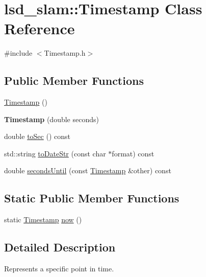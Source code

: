 \hypertarget{classlsd__slam_1_1_timestamp}{\section{lsd\-\_\-slam\-:\-:Timestamp Class Reference}
\label{classlsd__slam_1_1_timestamp}
}


{\ttfamily \#include $<$Timestamp.\-h$>$}

\subsection*{Public Member Functions}
\begin{DoxyCompactItemize}
\item 
\hyperlink{classlsd__slam_1_1_timestamp_a8e3fcd5158f45d25f8eb89d7aa615f66}{Timestamp} ()
\item 
\hypertarget{classlsd__slam_1_1_timestamp_a6f4a6030dcdeda85ad3718569b00d4cb}{{\bfseries Timestamp} (double seconds)}\label{classlsd__slam_1_1_timestamp_a6f4a6030dcdeda85ad3718569b00d4cb}

\item 
double \hyperlink{classlsd__slam_1_1_timestamp_a7f3a5a2a40b213c59e3a4195e801ffe6}{to\-Sec} () const 
\item 
std\-::string \hyperlink{classlsd__slam_1_1_timestamp_aca4015dc0ef5190447b152ac1fc8f848}{to\-Date\-Str} (const char $\ast$format) const 
\item 
double \hyperlink{classlsd__slam_1_1_timestamp_a4caed49b69cb2a1a6f0634dc5a76c7e8}{seconds\-Until} (const \hyperlink{classlsd__slam_1_1_timestamp}{Timestamp} \&other) const 
\end{DoxyCompactItemize}
\subsection*{Static Public Member Functions}
\begin{DoxyCompactItemize}
\item 
static \hyperlink{classlsd__slam_1_1_timestamp}{Timestamp} \hyperlink{classlsd__slam_1_1_timestamp_a2a6468867f6c98217a0bea2d064f142d}{now} ()
\end{DoxyCompactItemize}


\subsection{Detailed Description}
Represents a specific point in time. 

